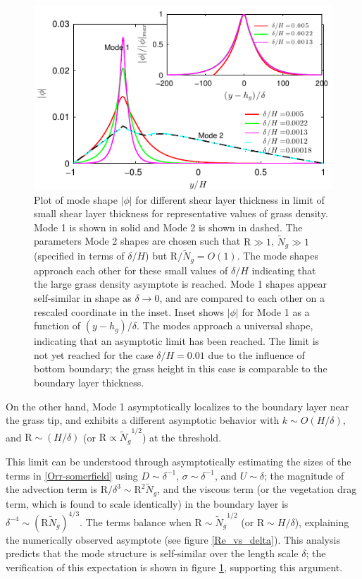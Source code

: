 \documentclass[aps,prl,reprint,twocolumn,showpacs,superscriptaddress,10pt]{revtex4-1}  %
\newcommand{\hg}{h_g}
\newcommand{\Rey}{\text{R}}
\newcommand{\Ndg}{\tilde{N}_g}
\begin{document}
\begin{figure}
\includegraphics[]{Asymptotic_noshear}
\caption{Plot of mode shape $|\phi|$ for different shear layer thickness in limit of small shear layer thickness for representative values of grass density. 
Mode 1 is shown in solid and Mode 2 is shown in dashed. The parameters Mode 2 shapes are chosen such that $\Rey \gg 1$, $\Ndg \gg 1$ (specified in terms of $\delta/H$) but $\Rey/\Ndg = O(1)$. 
The mode shapes approach each other for these small values of $\delta/H$ indicating that the large grass density asymptote is reached. Mode 1 shapes appear self-similar in shape as $\delta\to 0$, 
and are compared to each other on a rescaled coordinate in the inset. 
Inset shows $|\phi|$ for Mode 1 as a function of $(y-\hg)/\delta$. The modes approach a universal shape, indicating that an asymptotic limit has been reached. 
The limit is not yet reached for the case $\delta/H = 0.01$ due to the influence of bottom boundary; the grass height in this case is comparable to the boundary layer thickness.}
\label{Asymptotic_mode}
\end{figure}

On the other hand, Mode 1 asymptotically localizes to the boundary layer near the grass tip, and exhibits a different asymptotic behavior with $k \sim O(H/\delta)$, and $\Rey \sim (H/\delta)$ (or $\Rey \propto {\Ndg}^{1/2}$) at the threshold. 

This limit can be understood through asymptotically estimating the sizes of the terms in \eqref{Orr-somerfield} using $D\sim \delta^{-1}$, $\sigma \sim \delta^{-1}$, and $U\sim \delta$; the magnitude of the advection term is $\Rey/\delta^3 \sim \Rey^2 \Ndg $, and the viscous term (or the vegetation drag term, which is found to scale identically) in the boundary layer is $\delta^{-4} \sim (\Rey \Ndg)^{4/3}$. The terms balance when $\Rey \sim {\Ndg}^{1/2}$ (or $\Rey \sim H/\delta$), explaining the numerically observed asymptote (see figure \ref{Re_vs_delta}). This analysis predicts that the mode structure is self-similar over the length scale $\delta$; the verification of this expectation is shown in figure \ref{Asymptotic_mode}, supporting this argument.
\end{document}
